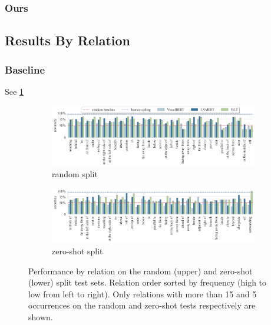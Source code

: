 \subsubsection{Ours}

\subsection{Results By Relation}

\subsubsection{Baseline}

See \cref{fig:performance_by_rel_base}

\begin{figure}
    \centering
\begin{subfigure}[b]{\linewidth}
    \centering
    \includegraphics[width=\linewidth]{images/visual-spatial-reasoning/performance_by_relation_random_split_v2.png}
    \vspace{-1cm}
    \caption{random split}
\end{subfigure}
\begin{subfigure}[b]{\linewidth}
    \centering
    \includegraphics[width=\linewidth]{images/visual-spatial-reasoning/performance_by_relation_zeroshot_split_v2.png}
    \vspace{-1cm}
    \caption{zero-shot split}
\end{subfigure}
\caption{Performance by relation on the random (upper) and zero-shot (lower) split test sets. Relation order sorted by frequency (high to low from left to right). Only relations with more than 15 and 5 occurrences on the random and zero-shot tests respectively are shown. }
    \label{fig:performance_by_rel_base}
\end{figure}

